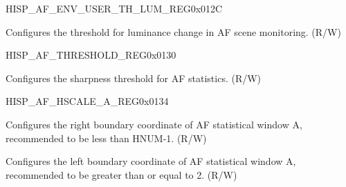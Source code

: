 \begin{register}{H}{ISP\_AF\_ENV\_USER\_TH\_LUM\_REG}{0x012C}\label{regdesc:ISPAFENVUSERTHLUMREG}
%
%
\regnewline%
\begin{regdesc}\begin{reglist}
\label{fielddesc:ISPAFENVUSERTHRESHOLDLUM}\item [ISP\_AF\_ENV\_USER\_THRESHOLD\_LUM] Configures the threshold for luminance change in AF scene monitoring. (R/W)
\end{reglist}\end{regdesc}
\end{register}


\begin{register}{H}{ISP\_AF\_THRESHOLD\_REG}{0x0130}\label{regdesc:ISPAFTHRESHOLDREG}
%
%
\regnewline%
\begin{regdesc}\begin{reglist}
\label{fielddesc:ISPAFTHRESHOLD}\item [ISP\_AF\_THRESHOLD] Configures the sharpness threshold for AF statistics. (R/W)
\end{reglist}\end{regdesc}
\end{register}


\begin{register}{H}{ISP\_AF\_HSCALE\_A\_REG}{0x0134}\label{regdesc:ISPAFHSCALEAREG}
%
%
%
%
\regnewline%
\begin{regdesc}\begin{reglist}
\label{fielddesc:ISPAFRPOINTA}\item [ISP\_AF\_RPOINT\_A] Configures the right boundary coordinate of AF statistical window A, recommended to be less than HNUM-1. (R/W)
\label{fielddesc:ISPAFLPOINTA}\item [ISP\_AF\_LPOINT\_A] Configures the left boundary coordinate of AF statistical window A, recommended to be greater than or equal to 2. (R/W)
\end{reglist}\end{regdesc}
\end{register}


